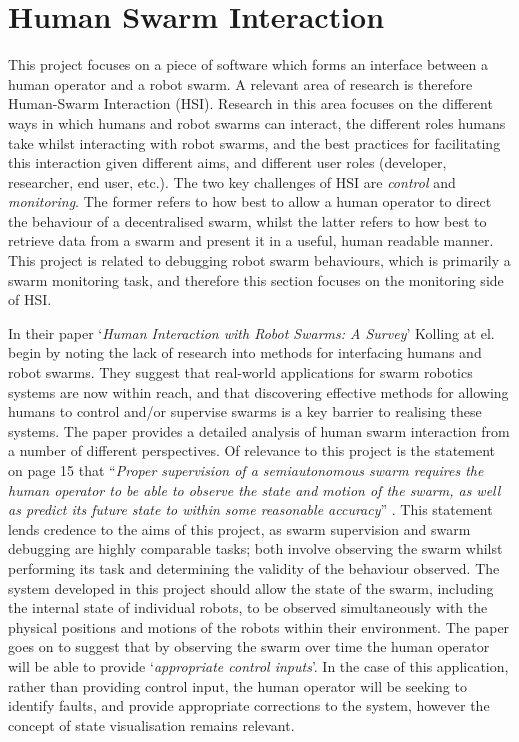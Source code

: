 
\section{Human Swarm Interaction} \label{HumanSwarmInteraction}
This project focuses on a piece of software which forms an interface between a human operator and a robot swarm. A relevant area of research is therefore Human-Swarm Interaction (HSI). Research in this area focuses on the different ways in which humans and robot swarms can interact, the different roles humans take whilst interacting with robot swarms, and the best practices for facilitating this interaction given different aims, and different user roles (developer, researcher, end user, etc.). The two key challenges of HSI are \textit{control} and \textit{monitoring}. The former refers to how best to allow a human operator to direct the behaviour of a decentralised swarm, whilst the latter refers to how best to retrieve data from a swarm and present it in a useful, human readable manner. This project is related to debugging robot swarm behaviours, which is primarily a swarm monitoring task, and therefore this section focuses on the monitoring side of HSI.

In their paper `\textit{Human Interaction with Robot Swarms: A Survey}' \cite{Kolling:2016} Kolling at el. begin by noting the lack of research into methods for interfacing humans and robot swarms. They suggest that real-world applications for swarm robotics systems are now within reach, and that discovering effective methods for allowing humans to control and/or supervise swarms is a key barrier to realising these systems. The paper \cite{Kolling:2016} provides a detailed analysis of human swarm interaction from a number of different perspectives. Of relevance to this project is the statement on page 15 that ``\textit{Proper supervision of a semiautonomous swarm requires the human operator to be able to observe the state and motion of the swarm, as well as predict its future state to within some reasonable accuracy}'' \cite{Kolling:2016}. This statement lends credence to the aims of this project, as swarm supervision and swarm debugging are highly comparable tasks; both involve observing the swarm whilst performing its task and determining the validity of the behaviour observed. The system developed in this project should allow the state of the swarm, including the internal state of individual robots, to be observed simultaneously with the physical positions and motions of the robots within their environment. The paper \cite{Kolling:2016} goes on to suggest that by observing the swarm over time the human operator will be able to provide `\textit{appropriate control inputs}'. In the case of this application, rather than providing control input, the human operator will be seeking to identify faults, and provide appropriate corrections to the system, however the concept of state visualisation remains relevant.

